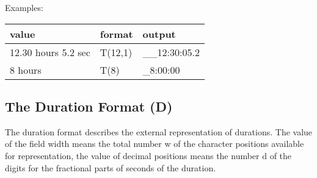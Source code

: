Examples:

\begin{tabular}{lll}
value               & format  & output \\ \hline
12.30 hours 5.2 sec & T(12,1) & \_\_12:30:05.2 \\
8 hours             & T(8)    & \_8:00:00
\end{tabular}

\subsection{The Duration Format (D)}   %
\label{sec_dation_d_format}



The duration format describes the external representation of durations.
The value of the field width means the total number w of the character
positions available for representation, the value of decimal positions
means the number d of the digits for the fractional parts of seconds of
the duration.


